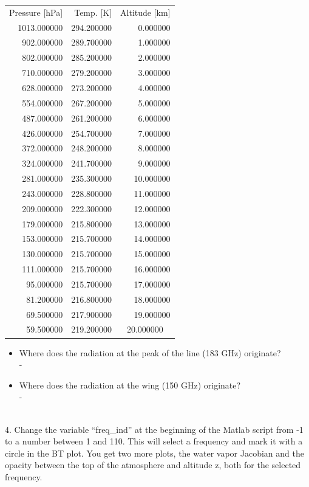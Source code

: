\documentclass[paper=a4, fontsize=11pt]{scrartcl} %
\numberwithin{figure}{section}
\begin{document}
\begin{tabular}{rrr}
Pressure [hPa] & Temp. [K] & Altitude [km] \\
1013.000000 &	294.200000 &	0.000000 \\
902.000000 &	289.700000 &	1.000000 \\
802.000000 &	285.200000 &	2.000000 \\
710.000000 &	279.200000 &	3.000000 \\
628.000000 &	273.200000 &	4.000000 \\
554.000000 &	267.200000 &	5.000000 \\
487.000000 &	261.200000 &	6.000000 \\
426.000000 &	254.700000 &	7.000000 \\
372.000000 &	248.200000 &	8.000000 \\
324.000000 &	241.700000 &	9.000000 \\
281.000000 &	235.300000 &	10.000000 \\
243.000000 &	228.800000 &	11.000000 \\
209.000000 &	222.300000 &	12.000000 \\
179.000000 &	215.800000 &	13.000000 \\
153.000000 &	215.700000 &	14.000000 \\
130.000000 &	215.700000 &	15.000000 \\
111.000000 &	215.700000 &	16.000000 \\
95.000000 &	215.700000 &	17.000000 \\
81.200000 &	216.800000 &	18.000000 \\
69.500000 &	217.900000 &	19.000000 \\
59.500000 &	219.200000 &	20.000000 \ \\
\end{tabular}

\begin{itemize} 
	\item Where does the radiation at the peak of the line (183 GHz) originate?\ \\ -

	\item Where does the radiation at the wing (150 GHz) originate?\ \\ - 
\end{itemize}

\ \\4. Change the variable ``freq\_ind'' at the beginning of the Matlab script from -1 to a number between 1 and 110. 
This will select a frequency and mark it with a circle in the BT plot. You get two more plots, the water vapor Jacobian and the opacity between 
the top of the atmosphere and altitude z, both for the selected frequency. \ \\
\end{document}
